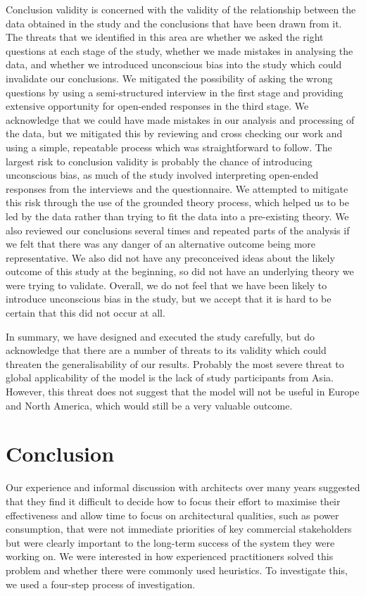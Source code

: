Conclusion validity is concerned with the validity of the relationship between the data obtained in the study and the conclusions that have been drawn from it.  The threats that we identified in this area are whether we asked the right questions at each stage of the study, whether we made mistakes in analysing the data, and whether we introduced unconscious bias into the study which could invalidate our conclusions.  We mitigated the possibility of asking the wrong questions by using a semi-structured interview in the first stage and providing extensive opportunity for open-ended responses in the third stage.  We acknowledge that we could have made mistakes in our analysis and processing of the data, but we mitigated this by reviewing and cross checking our work and using a simple, repeatable process which was straightforward to follow.  The largest risk to conclusion validity is probably the chance of introducing unconscious bias, as much of the study involved interpreting open-ended responses from the interviews and the questionnaire.  We attempted to mitigate this risk through the use of the grounded theory process, which helped us to be led by the data rather than trying to fit the data into a pre-existing theory.  We also reviewed our conclusions several times and repeated parts of the analysis if we felt that there was any danger of an alternative outcome being more representative.  We also did not have any preconceived ideas about the likely outcome of this study at the beginning, so did not have an underlying theory we were trying to validate.  Overall, we do not feel that we have been likely to introduce unconscious bias in the study, but we accept that it is hard to be certain that this did not occur at all.

In summary, we have designed and executed the study carefully, but do acknowledge that there are a number of threats to its validity which could threaten the generalisability of our results.  Probably the most severe threat to global applicability of the model is the lack of study participants from Asia.  However, this threat does not suggest that the model will not be useful in Europe and North America, which would still be a very valuable outcome.

\section{Conclusion}

Our experience and informal discussion with architects over many years suggested that they find it difficult to decide how to focus their effort to maximise their effectiveness and allow time to focus on architectural qualities, such as power consumption, that were not immediate priorities of key commercial stakeholders but were clearly important to the long-term success of the system they were working on.  We were interested in how experienced practitioners solved this problem and whether there were commonly used heuristics.  To investigate this, we used a four-step process of investigation.

